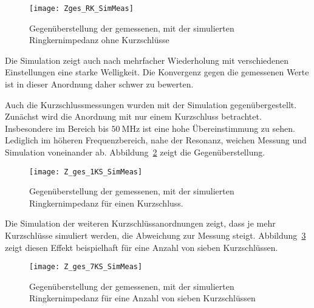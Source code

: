 \newpage



\begin{figure}[htb]
	\centering
	\texttt{[image: Zges\_RK\_SimMeas]}
	\caption{Gegen\"uberstellung der gemessenen, mit der simulierten Ringkernimpedanz ohne Kurzschl\"usse}
	\label{fig:boxpolycrossrk}
\end{figure}

Die Simulation zeigt auch nach mehrfacher Wiederholung mit verschiedenen Einstellungen eine starke Welligkeit. Die Konvergenz gegen die gemessenen Werte ist in dieser Anordnung daher schwer zu bewerten. 

\par
Auch die Kurzschlussmessungen wurden mit der Simulation gegen\"ubergestellt. Zun\"achst wird die Anordnung mit nur einem Kurzschluss betrachtet. Insbesondere im Bereich bis $\SI{50}{\mega\hertz}$ ist eine hohe \"Ubereinstimmung zu sehen. Lediglich im h\"oheren Frequenzbereich, nahe der Resonanz, weichen Messung und Simulation voneinander ab. Abbildung~\ref{fig:boxpolycrossrk1ks} zeigt die Gegen\"uberstellung.

\begin{figure}[htb]
	\centering
	\texttt{[image: Z\_ges\_1KS\_SimMeas]}
	\caption{Gegen\"uberstellung der gemessenen, mit der simulierten Ringkernimpedanz f\"ur einen Kurzschluss.}
	\label{fig:boxpolycrossrk1ks}
\end{figure}



\newpage



Die Simulation der weiteren Kurzschl\"ussanordnungen zeigt, dass je mehr Kurzschlüsse simuliert werden, die Abweichung zur Messung steigt. Abbildung~\ref{fig:boxpolycrossrk7ks} zeigt diesen Effekt beispielhaft f\"ur eine Anzahl von sieben Kurzschl\"ussen.

\begin{figure}[htb]
	\centering
	\texttt{[image: Z\_ges\_7KS\_SimMeas]}
	\caption{Gegen\"uberstellung der gemessenen, mit der simulierten Ringkernimpedanz f\"ur eine Anzahl von sieben Kurzschl\"ussen}
	\label{fig:boxpolycrossrk7ks}
\end{figure}

